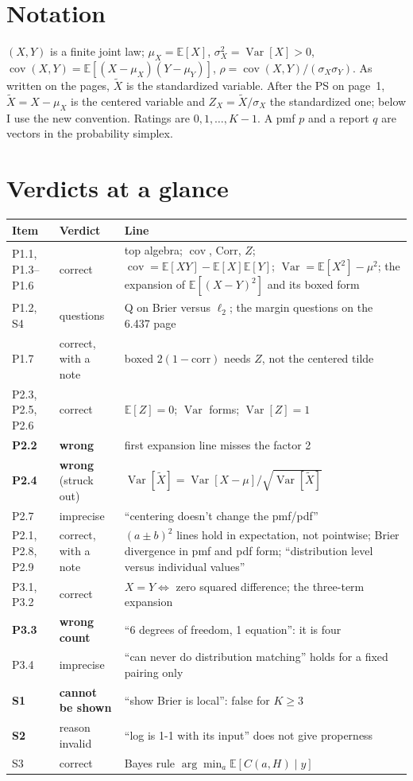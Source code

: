 \documentclass[11pt]{article}
\newcommand{\E}{\mathbb{E}}
\newcommand{\Var}{\operatorname{Var}}
\newcommand{\Cov}{\operatorname{cov}}
\begin{document}
\section*{Notation}

$(X,Y)$ is a finite joint law; $\mu_X=\E[X]$, $\sigma_X^2=\Var[X]>0$, $\Cov(X,Y)=\E[(X-\mu_X)(Y-\mu_Y)]$, $\rho=\Cov(X,Y)/(\sigma_X\sigma_Y)$. As written on the pages, $\tilde X$ is the standardized variable. After the PS on page~1, $\tilde X=X-\mu_X$ is the centered variable and $Z_X=\tilde X/\sigma_X$ the standardized one; below I use the new convention. Ratings are $0,1,\dots,K-1$. A pmf $p$ and a report $q$ are vectors in the probability simplex.

\section*{Verdicts at a glance}

\begin{center}
\small
\begin{tabular}{@{}L{3.3cm}L{3.3cm}L{9.2cm}@{}}
\toprule
Item & Verdict & Line \\
\midrule
P1.1, P1.3--P1.6 & correct & top algebra; $\Cov$, $\mathrm{Corr}$, $Z$; $\Cov=\E[XY]-\E[X]\E[Y]$; $\Var=\E[X^2]-\mu^2$; the expansion of $\E[(X-Y)^2]$ and its boxed form \\
P1.2, S4 & questions & Q on Brier versus $\ell_2$; the margin questions on the 6.437 page \\
P1.7 & correct, with a note & boxed $2(1-\mathrm{corr})$ needs $Z$, not the centered tilde \\
P2.3, P2.5, P2.6 & correct & $\E[Z]=0$; $\Var$ forms; $\Var[Z]=1$ \\
\textbf{P2.2} & \textbf{wrong} & first expansion line misses the factor 2 \\
\textbf{P2.4} & \textbf{wrong} (struck out) & $\Var[\tilde X]=\Var[X-\mu]/\sqrt{\Var[\tilde X]}$ \\
P2.7 & imprecise & ``centering doesn't change the pmf/pdf'' \\
P2.1, P2.8, P2.9 & correct, with a note & $(a\pm b)^2$ lines hold in expectation, not pointwise; Brier divergence in pmf and pdf form; ``distribution level versus individual values'' \\
P3.1, P3.2 & correct & $X=Y\Leftrightarrow$ zero squared difference; the three-term expansion \\
\textbf{P3.3} & \textbf{wrong count} & ``6 degrees of freedom, 1 equation'': it is four \\
P3.4 & imprecise & ``can never do distribution matching'' holds for a fixed pairing only \\
\textbf{S1} & \textbf{cannot be shown} & ``show Brier is local'': false for $K\ge3$ \\
\textbf{S2} & reason invalid & ``log is 1-1 with its input'' does not give properness \\
S3 & correct & Bayes rule $\arg\min_a\E[C(a,H)\mid y]$ \\
\bottomrule
\end{tabular}
\end{center}
\end{document}
